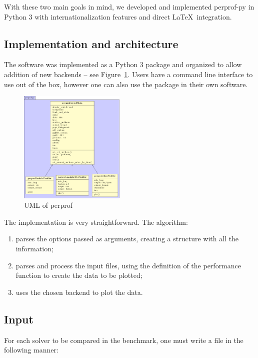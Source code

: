     With these two main goals in mind, we developed and implemented perprof-py
    in Python 3 with internationalization features and direct \LaTeX\
    integration.

\subsection*{Implementation and architecture}

    The software was implemented as a Python 3 package
    and organized
    to allow addition of new backends --  see Figure~\ref{fig:uml}.
    Users have a command line interface to use out of the box,
    however one can also use the package in their own software.

    \begin{figure}[!htb]
      \centering
      \includegraphics[width=0.45\textwidth]{uml/uml.pdf}
      \caption{UML of perprof}
      \label{fig:uml}
    \end{figure}

    The implementation is very straightforward. The algorithm:
    \begin{enumerate}
      \item parses the options passed as arguments, creating a
        structure with all the information;
      \item parses and process the input files, using the definition
        of the performance function to create the data to be plotted;
      \item uses the chosen backend to plot the data.
    \end{enumerate}

\subsection*{Input}

    For each solver to be compared in the benchmark, one must write a file in
    the following manner:

